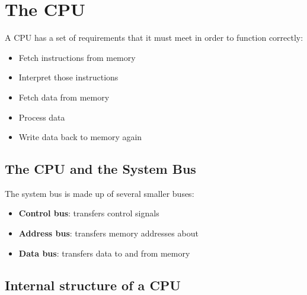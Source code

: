 \section{The CPU}\label{sec:the_cpu}

A CPU has a set of requirements that it must meet in order to function correctly:
\begin{itemize}
	\item Fetch instructions from memory
	\item Interpret those instructions
	\item Fetch data from memory
	\item Process data
	\item Write data back to memory again
\end{itemize}

\subsection{The CPU and the System Bus}\label{sub:the_cpu_and_the_system_bus}

The system bus is made up of several smaller buses:
\begin{itemize}
	\item \textbf{Control bus}: transfers control signals
	\item \textbf{Address bus}: transfers memory addresses about
	\item \textbf{Data bus}: transfers data to and from memory
\end{itemize}

\subsection{Internal structure of a CPU}\label{sub:internal_structure_of_a_cpu}

